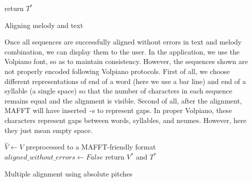 \begin{algorithm}[H]
    \BlankLine
    return $T^*$\;
    \caption{Aligning melody and text}
    \label{algo:volpiano_text_combine}
\end{algorithm}

Once all sequences are successfully aligned without errors in text and melody combination, we can display them to the user. In the application, we use the Volpiano font,
so as to maintain consistency. However, the sequences shown are not properly encoded following Volpiano protocols. First of all, we choose different representations of end of a word
(here we use a bar line) and end of a syllable (a single space) so that the number of characters in each sequence remains equal and the alignment is visible. Second of all,
after the alignment, MAFFT will have inserted \verb|-|s to represent gaps. In proper Volpiano, these characters represent gaps between words, syllables, and neumes. However,
here they just mean empty space.\newline

\begin{algorithm}[H]
    \BlankLine
    $\hat{V} \longleftarrow V$ preprocessed to a MAFFT-friendly format\;
    $aligned\_without\_errors \longleftarrow False$\;
    return $V^*$ and $T^*$\;
    \caption{Multiple alignment using absolute pitches}
    \label{algo:align_pitch}
\end{algorithm}

